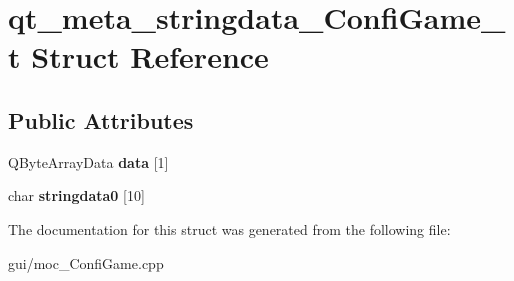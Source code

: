 \hypertarget{structqt__meta__stringdata___confi_game__t}{}\section{qt\+\_\+meta\+\_\+stringdata\+\_\+\+Confi\+Game\+\_\+t Struct Reference}
\label{structqt__meta__stringdata___confi_game__t}
\subsection*{Public Attributes}
\begin{DoxyCompactItemize}
\item 
\mbox{\label{structqt__meta__stringdata___confi_game__t_ac7cb970c77391ba702f94cd5313929c6}} 
Q\+Byte\+Array\+Data {\bfseries data} \mbox{[}1\mbox{]}
\item 
\mbox{\label{structqt__meta__stringdata___confi_game__t_a4763bc6b4aab5064a7f4296b5e178fb5}} 
char {\bfseries stringdata0} \mbox{[}10\mbox{]}
\end{DoxyCompactItemize}


The documentation for this struct was generated from the following file\+:\begin{DoxyCompactItemize}
\item 
gui/moc\+\_\+\+Confi\+Game.\+cpp\end{DoxyCompactItemize}
